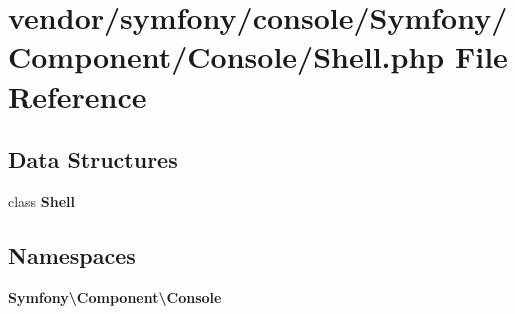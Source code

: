 \section{vendor/symfony/console/\+Symfony/\+Component/\+Console/\+Shell.php File Reference}
\label{symfony_2console_2_symfony_2_component_2_console_2_shell_8php}
\subsection*{Data Structures}
\begin{DoxyCompactItemize}
\item 
class {\bf Shell}
\end{DoxyCompactItemize}
\subsection*{Namespaces}
\begin{DoxyCompactItemize}
\item 
 {\bf Symfony\textbackslash{}\+Component\textbackslash{}\+Console}
\end{DoxyCompactItemize}
